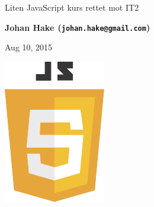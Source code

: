 \documentclass[%
oneside,                 %
final,                   %
10pt]{article}
\begin{document}






\thispagestyle{empty}

\begin{center}
{\LARGE\bf
\begin{spacing}{1.25}
Liten JavaScript kurs rettet mot IT2
\end{spacing}
}
\end{center}


\begin{center}
{\bf Johan Hake${}^{}$ (\texttt{johan.hake@gmail.com})} \\ [0mm]
\end{center}

\begin{center}
\end{center}
    

\begin{center} %
Aug 10, 2015
\end{center}

\vspace{1cm}





\centerline{\includegraphics[width=0.5\linewidth]{figures/javascript-seeklogo.pdf}}
\end{document}
